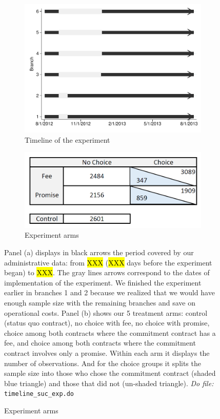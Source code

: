 \documentclass[11pt]{article}
\begin{document}
\begin{figure}[H]
     \caption{Experiment description}
    \label{exp_description}
    \begin{center}
    \begin{subfigure}{.50\textwidth}
      \caption{Timeline of the experiment}
        \centering
        \includegraphics[width=\textwidth]{Figuras/timeline_suc_exp_extended.pdf}
    \end{subfigure}
    \begin{subfigure}{0.45\textwidth}
    \caption{Experiment arms}
       \centering
      \includegraphics[width=\textwidth]{Figuras/exp_arms.PNG}
    \end{subfigure}
    \end{center}
         \scriptsize Panel (a) displays in black arrows the period covered by our administrative data: from \hl{XXX} (\hl{XXX} days before the experiment began) to \hl{XXX}. The gray lines arrows correspond to the dates of implementation of the experiment. We finished the experiment earlier in branches 1 and 2 because we realized that we would have enough sample size with the remaining branches and save on operational costs. Panel (b) shows our 5 treatment arms: control (status quo contract), no choice with fee, no choice with promise, choice among both contracts where the commitment contract has a fee, and choice among both contracts where the commitment contract involves only a promise. Within each arm it displays the number of observations. And  for the choice groups it splits the sample size into those who chose the commitment contract (shaded blue triangle) and those that did not (un-shaded triangle).
      \textit{Do file: }  \texttt{timeline\_suc\_exp.do}
\end{figure}
\end{document}
